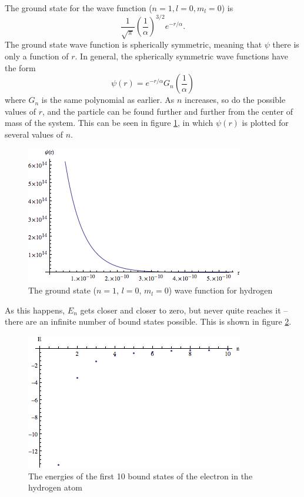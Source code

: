\documentclass[12pt,twoside]{reedthesis}
\newcommand{\eqn}[1]{\begin{equation}#1\end{equation}}
\begin{document}
The ground state for the wave function ($n = 1, l = 0, m_l = 0$) is
\eqn{\frac{1}{\sqrt{\pi}}\left(\frac{1}{\alpha}\right)^{3/2} e^{-r/\alpha}\mbox{.}
}
The ground state wave function is spherically symmetric, meaning that $\psi$ there is only a function of $r$. In general, the spherically symmetric wave functions have the form
\eqn{
\psi(r) = e^{-r/\alpha} G_{n}\left(\frac{1}{\alpha}\right)
}
where $G_n$ is the same polynomial as earlier.
As $n$ increases, so do the possible values of $r$, and the particle can be found further and further from the center of mass of the system. This can be seen in figure \ref{fig:hfuncs}, in which $\psi(r)$ is plotted for several values of $n$.
\begin{figure}
\includegraphics[scale=0.75]{hydground.png}
\caption{The ground state ($n=1$, $l =0$, $m_l= 0$) wave function for hydrogen}
\label{fig:hfuncs}
\end{figure}
As this happens, $E_n$ gets closer and closer to zero, but never quite reaches it -- there are an infinite number of bound states possible. This is shown in figure \ref{fig:hspec}.
\begin{figure}[h]
\includegraphics[scale=0.75]{hydrogenspectrum.png}
\caption{The energies of the first 10 bound states of the electron in the hydrogen atom}
\label{fig:hspec}
\end{figure}
\end{document}
